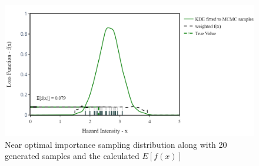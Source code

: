     \begin{figure}[H]
        \centering
        \includegraphics[scale=0.55]{Figures/Images/Illustrative Example/MCMC_IS_samples.png}
        \caption{Near optimal importance sampling distribution along with 20 generated samples and the calculated $E[f(x)]$}
        \label{fig:MCMC_IS_samples}
    \end{figure}